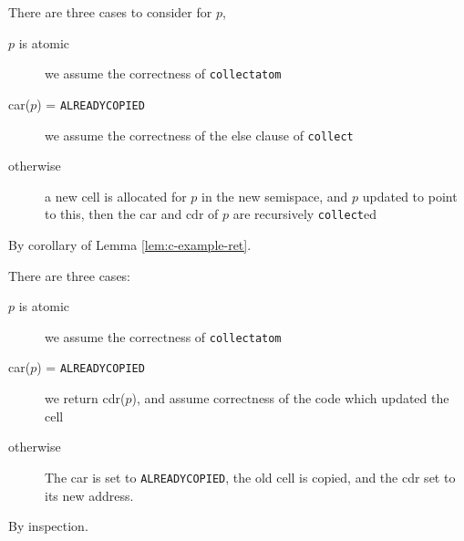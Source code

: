 \begin{lemma}
  \label{lem:c-example-reach}
  There are three cases to consider for $p$,

  \begin{description}
  \item[$p$ is atomic] we assume the correctness of
    \texttt{collectatom}

  \item[car($p$) = \texttt{ALREADYCOPIED}] we assume the correctness
    of the else clause of \texttt{collect}

  \item[otherwise] a new cell is allocated for $p$ in the new
    semispace, and $p$ updated to point to this, then the car and cdr
    of $p$ are recursively \texttt{collect}ed
  \end{description}
\end{lemma}

\begin{lemma}
  \label{lem:c-example-duplication}
  By corollary of Lemma \ref{lem:c-example-ret}.
\end{lemma}

\begin{lemma}
  \label{lem:c-example-ret}
  There are three cases:

  \begin{description}
  \item[$p$ is atomic] we assume the correctness of
    \texttt{collectatom}

  \item[car($p$) = \texttt{ALREADYCOPIED}] we return cdr($p$), and
    assume correctness of the code which updated the cell

  \item[otherwise] The car is set to \texttt{ALREADYCOPIED}, the old
    cell is copied, and the cdr set to its new address.
  \end{description}
\end{lemma}

\begin{lemma}
  \label{lem:c-example-update}
  By inspection.
\end{lemma}


